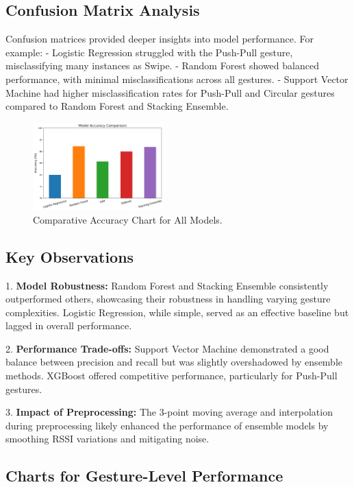 \documentclass[10pt,twocolumn,letterpaper]{article}
\begin{document}
\subsection{Confusion Matrix Analysis}

Confusion matrices provided deeper insights into model performance. For example:
- Logistic Regression struggled with the Push-Pull gesture, misclassifying many instances as Swipe.
- Random Forest showed balanced performance, with minimal misclassifications across all gestures.
- Support Vector Machine had higher misclassification rates for Push-Pull and Circular gestures compared to Random Forest and Stacking Ensemble.

\begin{figure}[h]
  \centering
  \includegraphics[width=0.45\textwidth]{figures/comparative_accuracy_chart.png}
  \caption{Comparative Accuracy Chart for All Models.}
  \label{fig:comparative_accuracy}
\end{figure}


\subsection{Key Observations}

1. \textbf{Model Robustness:}
   Random Forest and Stacking Ensemble consistently outperformed others, showcasing their robustness in handling varying gesture complexities.
   Logistic Regression, while simple, served as an effective baseline but lagged in overall performance.

2. \textbf{Performance Trade-offs:}
   Support Vector Machine demonstrated a good balance between precision and recall but was slightly overshadowed by ensemble methods.
   XGBoost offered competitive performance, particularly for Push-Pull gestures.

3. \textbf{Impact of Preprocessing:}
   The 3-point moving average and interpolation during preprocessing likely enhanced the performance of ensemble models by smoothing RSSI variations and mitigating noise.

\subsection{Charts for Gesture-Level Performance}
\end{document}
